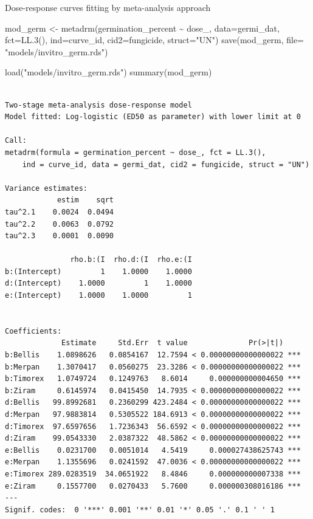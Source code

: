 \documentclass[
  letterpaper,
  DIV=11,
  numbers=noendperiod]{scrreport}
\newenvironment{Shaded}{\begin{snugshade}}{\end{snugshade}}
\newcommand{\AttributeTok}[1]{\textcolor[rgb]{0.40,0.45,0.13}{#1}}
\newcommand{\FunctionTok}[1]{\textcolor[rgb]{0.28,0.35,0.67}{#1}}
\newcommand{\NormalTok}[1]{\textcolor[rgb]{0.00,0.23,0.31}{#1}}
\newcommand{\OtherTok}[1]{\textcolor[rgb]{0.00,0.23,0.31}{#1}}
\newcommand{\SpecialCharTok}[1]{\textcolor[rgb]{0.37,0.37,0.37}{#1}}
\newcommand{\StringTok}[1]{\textcolor[rgb]{0.13,0.47,0.30}{#1}}
\begin{document}
Dose-response curves fitting by meta-analysis approach

\begin{Shaded}
\begin{Highlighting}[]
\NormalTok{mod\_germ }\OtherTok{\textless{}{-}} \FunctionTok{metadrm}\NormalTok{(germination\_percent }\SpecialCharTok{\textasciitilde{}}\NormalTok{ dose\_, }
               \AttributeTok{data=}\NormalTok{germi\_dat,}
               \AttributeTok{fct=}\FunctionTok{LL.3}\NormalTok{(),}
               \AttributeTok{ind=}\NormalTok{curve\_id,}
               \AttributeTok{cid2=}\NormalTok{fungicide,}
               \AttributeTok{struct=}\StringTok{"UN"}\NormalTok{)}
\FunctionTok{save}\NormalTok{(mod\_germ, }\AttributeTok{file=} \StringTok{"models/invitro\_germ.rds"}\NormalTok{)}
\end{Highlighting}
\end{Shaded}

\begin{Shaded}
\begin{Highlighting}[]
\FunctionTok{load}\NormalTok{(}\StringTok{"models/invitro\_germ.rds"}\NormalTok{)}
\FunctionTok{summary}\NormalTok{(mod\_germ) }
\end{Highlighting}
\end{Shaded}

\begin{verbatim}

Two-stage meta-analysis dose-response model
Model fitted: Log-logistic (ED50 as parameter) with lower limit at 0

Call:
metadrm(formula = germination_percent ~ dose_, fct = LL.3(), 
    ind = curve_id, data = germi_dat, cid2 = fungicide, struct = "UN")

Variance estimates:
            estim    sqrt
tau^2.1    0.0024  0.0494
tau^2.2    0.0063  0.0792
tau^2.3    0.0001  0.0090

               rho.b:(I  rho.d:(I  rho.e:(I
b:(Intercept)         1    1.0000    1.0000
d:(Intercept)    1.0000         1    1.0000
e:(Intercept)    1.0000    1.0000         1


Coefficients:
             Estimate     Std.Err  t value              Pr(>|t|)    
b:Bellis    1.0898626   0.0854167  12.7594 < 0.00000000000000022 ***
b:Merpan    1.3070417   0.0560275  23.3286 < 0.00000000000000022 ***
b:Timorex   1.0749724   0.1249763   8.6014     0.000000000004650 ***
b:Ziram     0.6145974   0.0415450  14.7935 < 0.00000000000000022 ***
d:Bellis   99.8992681   0.2360299 423.2484 < 0.00000000000000022 ***
d:Merpan   97.9883814   0.5305522 184.6913 < 0.00000000000000022 ***
d:Timorex  97.6597656   1.7236343  56.6592 < 0.00000000000000022 ***
d:Ziram    99.0543330   2.0387322  48.5862 < 0.00000000000000022 ***
e:Bellis    0.0231700   0.0051014   4.5419     0.000027438625743 ***
e:Merpan    1.1355696   0.0241592  47.0036 < 0.00000000000000022 ***
e:Timorex 289.0283519  34.0651922   8.4846     0.000000000007338 ***
e:Ziram     0.1557700   0.0270433   5.7600     0.000000308016186 ***
---
Signif. codes:  0 '***' 0.001 '**' 0.01 '*' 0.05 '.' 0.1 ' ' 1
\end{verbatim}
\end{document}
